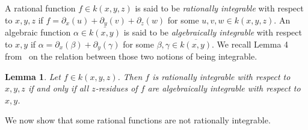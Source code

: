\documentclass{amsart}
\newtheorem{lem}[thm]{Lemma}
\theoremstyle{definition}
\numberwithin{equation}{section}
\numberwithin{thm}{section}
\begin{document}
A rational function $f\in k(x, y, z)$ is said to be \textit{rationally integrable} with respect to $x, y, z$ if $f=\partial_x(u)+\partial_y(v)+\partial_z(w)$ for some $u, v, w\in k(x, y, z)$. An algebraic function $\alpha\in
\overline{k(x, y)}$ is said to be \textit{algebraically integrable} with respect to $x, y$ if $\alpha =\partial_x(\beta) + \partial_y(\gamma)$ for some $\beta, \gamma\in \overline{k(x, y)}$. We recall Lemma 4 from~\cite{ChenKauersSinger2012} on the relation between those two notions of being integrable.

\begin{lem}
\label{LEM:ratsol}
Let $f\in k(x, y, z)$. Then $f$ is rationally integrable with respect to $x, y, z$ if and only if all $z$-residues of $f$ are algebraically integrable with respect to~$x, y$.
\end{lem}

We now show that some rational functions are not rationally integrable.
\end{document}
